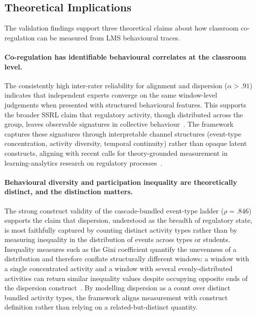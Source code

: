 \documentclass[preprint,12pt,authoryear]{elsarticle}
\begin{document}
\subsection{Theoretical Implications}
\label{sec:discuss_theory}

The validation findings support three theoretical claims about how classroom co-regulation can be measured from LMS behavioural traces.

\paragraph{Co-regulation has identifiable behavioural correlates at the classroom level.}
The consistently high inter-rater reliability for alignment and dispersion ($\alpha > .91$) indicates that independent experts converge on the same window-level judgements when presented with structured behavioural features. This supports the broader SSRL claim that regulatory activity, though distributed across the group, leaves observable signatures in collective behaviour~\citep{hadwin2018, jarvela2021, malmberg2017}. The framework captures these signatures through interpretable channel structures (event-type concentration, activity diversity, temporal continuity) rather than opaque latent constructs, aligning with recent calls for theory-grounded measurement in learning-analytics research on regulatory processes~\citep{molenaar2023}.

\paragraph{Behavioural diversity and participation inequality are theoretically distinct, and the distinction matters.}
The strong construct validity of the cascade-bundled event-type ladder ($\rho = .846$) supports the claim that dispersion, understood as the breadth of regulatory state, is most faithfully captured by counting distinct activity types rather than by measuring inequality in the distribution of events across types or students. Inequality measures such as the Gini coefficient quantify the unevenness of a distribution and therefore conflate structurally different windows: a window with a single concentrated activity and a window with several evenly-distributed activities can return similar inequality values despite occupying opposite ends of the dispersion construct~\citep{cowell2011, stirling2007}. By modelling dispersion as a count over distinct bundled activity types, the framework aligns measurement with construct definition rather than relying on a related-but-distinct quantity.
\end{document}
